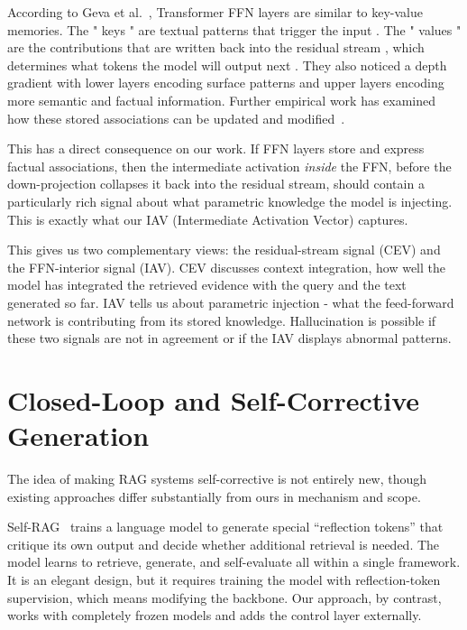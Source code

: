 According to Geva et al.~\cite{geva2021ffn}, Transformer FFN layers are similar to key-value memories. The " keys " are textual patterns that trigger the input . The " values " are the contributions that are written back into the residual stream , which determines what tokens the model will output next . They also noticed a depth gradient with lower layers encoding surface patterns and upper layers encoding more semantic and factual information. Further empirical work has examined how these stored associations can be updated and modified~\cite{qiu2024updating}.

This has a direct consequence on our work. If FFN layers store and express factual associations, then the intermediate activation \emph{inside} the FFN, before the down-projection collapses it back into the residual stream, should contain a particularly rich signal about what parametric knowledge the model is injecting. This is exactly what our IAV (Intermediate Activation Vector) captures.

This gives us two complementary views: the residual-stream signal (CEV) and the FFN-interior signal (IAV). CEV discusses context integration, how well the model has integrated the retrieved evidence with the query and the text generated so far. IAV tells us about parametric injection - what the feed-forward network is contributing from its stored knowledge. Hallucination is possible if these two signals are not in agreement or if the IAV displays abnormal patterns.

\section{Closed-Loop and Self-Corrective Generation}
\label{sec:lit_closedloop}

The idea of making RAG systems self-corrective is not entirely new, though existing approaches differ substantially from ours in mechanism and scope.

Self-RAG~\cite{asai2024selfrag} trains a language model to generate special ``reflection tokens'' that critique its own output and decide whether additional retrieval is needed. The model learns to retrieve, generate, and self-evaluate all within a single framework. It is an elegant design, but it requires training the model with reflection-token supervision, which means modifying the backbone. Our approach, by contrast, works with completely frozen models and adds the control layer externally.


